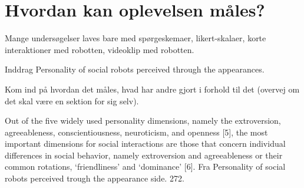 \chapter{Hvordan kan oplevelsen måles?}
\label{InteraktionSocialeRobotterOplevelse}
%
Mange undersøgelser laves bare med spørgeskemaer, likert-skalaer, korte interaktioner med robotten, videoklip med robotten. 

Inddrag Personality of social robots perceived through the appearances.

Kom ind på hvordan det måles, hvad har andre gjort i forhold til det (overvej om det skal være en sektion for sig selv).\blankline


Out of the five widely used personality dimensions, namely the extroversion, agreeableness, conscientiousness, neuroticism, and openness [5], the most important dimensions for social interactions are those that concern individual differences in social behavior, namely extroversion and agreeableness or their common rotations, ‘friendliness’ and ‘dominance’ [6]. Fra Personality of social robots perceived trough the appearance side. 272.